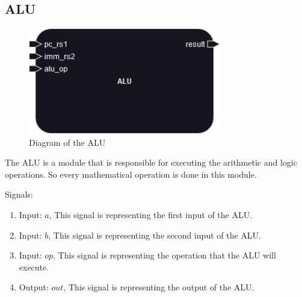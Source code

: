 \subsection{ALU}

\begin{figure}[H]
\centering
\includegraphics[width=0.75\textwidth]{../diagrams/execute/alu.png}
\caption{Diagram of the ALU}
\label{fig:alu}
\end{figure}

The ALU is a module that is responsible for executing the arithmetic and logic operations. So every mathematical operation is done in this module.

Signals:
\begin{enumerate}[label={\textbullet}]
    \item Input: $a$, This signal is representing the first input of the ALU.
    \item Input: $b$, This signal is representing the second input of the ALU.
    \item Input: $op$, This signal is representing the operation that the ALU will execute.
    \item Output: $out$, This signal is representing the output of the ALU.
\end{enumerate}